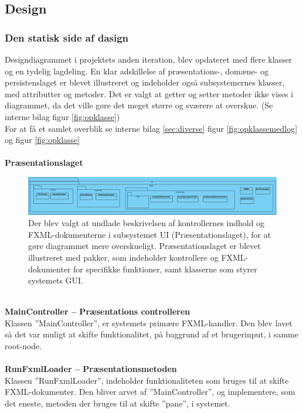 \subsection{Design}
\subsubsection{Den statisk side af dasign}
Designdiagrammet i projektets anden iteration, blev opdateret med flere klasser og en tydelig lagdeling. En klar adskillelse af præsentations-, domæne- og persistenslaget er blevet illustreret og indeholder også subsystemernes klasser, med attributter og metoder. Det er valgt at getter og setter metoder ikke vises i diagrammet, da det ville gøre det meget større og sværere at overskue. (Se interne bilag figur \ref{fig:opklasse})\\
For at få et samlet overblik se interne bilag \ref{sec:diverse} figur \ref{fig:opklassemedlog} og figur \ref{fig:opklasse}\\ \\
\textbf{Præsentationslaget}
\begin{figure}[htb!]
  \includegraphics[width = \linewidth]{./PNG/design/UIopdateretKlassediagram.PNG} 
  \caption{Der blev valgt at undlade beskrivelsen af kontrollernes indhold og FXML-dokumenterne i subsystemet UI (Præsentationslaget), for at gøre diagrammet mere overskueligt. Præsentationslaget er blevet illustreret med pakker, som indeholder kontrollere og FXML-dokumenter for specifikke funktioner, samt klasserne som styrer systemets GUI.}
  \label{fig:2pre}
\end{figure}
\\\textbf{MainController – Præsentations controlleren}\\
Klassen ”MainController”, er systemets primære FXML-handler. Den blev lavet så det var muligt at skifte funktionalitet, på baggrund af et brugerinput, i samme root-node.\\\\
\textbf{RunFxmlLoader – Præsentationsmetoden}\\
Klassen ”RunFxmlLoader”, indeholder funktionaliteten som bruges til at skifte FXML-dokumenter. Den bliver arvet af ”MainController”, og implementere, som det eneste, metoden der bruges til at skifte ”pane”, i systemet.\\\\
